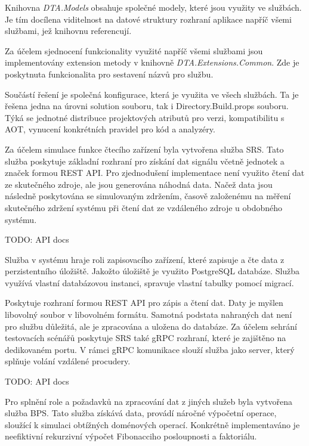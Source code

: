 
Knihovna \emph{DTA.Models} obsahuje společné modely, které jsou využity ve službách. Je tím docílena viditelnost na datové struktury rozhraní aplikace napříč všemi službami, jež knihovnu referencují.


Za účelem sjednocení funkcionality využité napříč všemi službami jsou implementovány extension metody v knihovně \emph{DTA.Extensions.Common}. Zde je poskytnuta funkcionalita pro sestavení názvů pro službu.


Součástí řešení je společná konfigurace, která je využita ve všech službách. Ta je řešena jedna na úrovni solution souboru, tak i Directory.Build.props souboru. Týká se jednotné distribuce projektových atributů pro verzi, kompatibilitu s AOT, vynucení konkrétních pravidel pro kód a analyzéry.


Za účelem simulace funkce čtecího zařízení byla vytvořena služba SRS. Tato služba poskytuje základní rozhraní pro získání dat signálu včetně jednotek a značek formou REST API. Pro zjednodušení implementace není využito čtení dat ze skutečného zdroje, ale jsou generována náhodná data. Načež data jsou následně poskytována se simulovaným zdržením, časově založenému na měření skutečného zdržení systému při čtení dat ze vzdáleného zdroje u obdobného systému.

TODO: API docs


Služba v systému hraje roli zapisovacího zařízení, které zapisuje a čte data z perzistentního úložiště. Jakožto úložiště je využito PostgreSQL databáze. Služba využívá vlastní databázovou instanci, spravuje vlastní tabulky pomocí migrací.

Poskytuje rozhraní formou REST API pro zápis a čtení dat. Daty je myšlen libovolný soubor v libovolném formátu. Samotná podstata nahraných dat není pro službu důležitá, ale je zpracována a uložena do databáze. Za účelem sehrání testovacích scénářů poskytuje SRS také gRPC rozhraní, které je zajištěno na dedikovaném portu. V rámci gRPC komunikace slouží služba jako server, který splňuje volání vzdálené procudery.

TODO: API docs


Pro splnění role a požadavků na zpracování dat z jiných služeb byla vytvořena služba BPS. Tato služba získává data, provádí náročné výpočetní operace, sloužící k simulaci obtížných doménových operací. Konkrétně implementaváno je neefiktivní rekurzivní výpočet Fibonacciho posloupnosti a faktoriálu.

